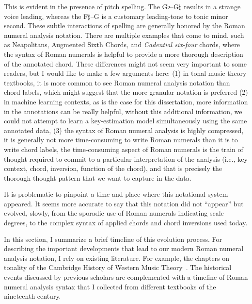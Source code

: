 This is evident in the presence of pitch spelling.
The G$\flat$--G$\natural$ results in a strange voice leading, whereas the F$\sharp$--G is a customary leading-tone to tonic minor second.
These subtle interactions of spelling are generally honored by the Roman numeral analysis notation.
There are multiple examples that come to mind, such as Neapolitans, Augmented Sixth Chords, and \emph{Cadential six-four} chords, where the syntax of Roman numerals is helpful to provide a more thorough description of the annotated chord.
These differences might not seem very important to some readers, but I would like to make a few arguments here: (1) in tonal music theory textbooks, it is more common to see Roman numeral analysis notation than chord labels, which might suggest that the more granular notation is preferred (2) in machine learning contexts, as is the case for this dissertation, more information in the annotations can be really helpful, without this additional information, we could not attempt to learn a key-estimation model simultaneously using the same annotated data, (3) the syntax of Roman numeral analysis is highly compressed, it is generally not more time-consuming to write Roman numerals than it is to write chord labels, the time-consuming aspect of Roman numerals is the train of thought required to commit to a particular interpretation of the analysis (i.e., key context, chord, inversion, function of the chord), and that is precisely the thorough thought pattern that we want to capture in the data.


It is problematic to pinpoint a time and place where this notational system appeared.
It seems more accurate to say that this notation did not ``appear'' but evolved, slowly, from the sporadic use of Roman numerals indicating scale degrees, to the complex syntax of applied chords and chord inversions used today.

In this section, I summarize a brief timeline of this evolution process.
For describing the important developments that lead to our modern Roman numeral analysis notation, I rely on existing literature.
For example, the chapters on tonality of the Cambridge History of Western Music Theory~\parencite{christensen_tonality_2002, christensen_rameau_2002, christensen_nineteenth-century_2002, christensen_heinrich_2002}.
The historical events discussed by previous scholars are complemented with a timeline of Roman numeral analysis syntax that I collected from different textbooks of the nineteenth century.

